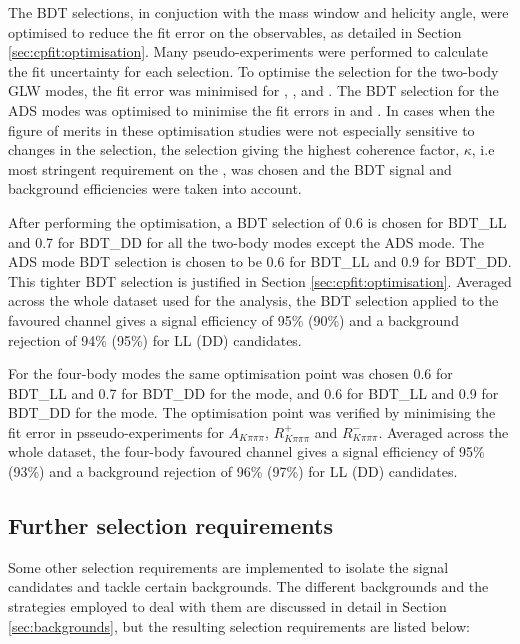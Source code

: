 The BDT selections, in conjuction with the \Kstarm mass window and \KS helicity angle, were optimised to reduce the fit error on the \CP observables, as detailed in Section \ref{sec:cpfit:optimisation}. Many pseudo-experiments were performed to calculate the fit uncertainty for each selection. To optimise the selection for the two-body GLW modes, the fit error was minimised for \Akk, \Rkk, \Apipi and \Rpipi. The BDT selection for the ADS modes was optimised to minimise the fit errors in \Rptwo and \Rmtwo. In cases when the figure of merits in these optimisation studies were not especially sensitive to changes in the selection, the selection giving the highest coherence factor, $\kappa$, i.e most stringent requirement on the \Kstarm, was chosen and the BDT signal and background efficiencies were taken into account.

After performing the optimisation, a BDT selection of 0.6 is chosen for BDT\_LL and 0.7 for BDT\_DD for all the two-body \D modes except the ADS mode. The ADS mode BDT selection is chosen to be 0.6 for BDT\_LL and 0.9 for BDT\_DD. This tighter BDT selection is justified in Section \ref{sec:cpfit:optimisation}. Averaged across the whole dataset used for the analysis, the BDT selection applied to the favoured \kpi channel gives a signal efficiency of 95\% (90\%) and a background rejection of 94\% (95\%) for LL (DD) candidates. 

For the four-body modes the same optimisation point was chosen 0.6 for BDT\_LL and 0.7 for BDT\_DD for the \decay{\Dz}{\Kp\pim\pip\pim} \decay{\Dz}{\pi\pi\pi\pi} mode, and 0.6 for BDT\_LL and 0.9 for BDT\_DD for the \decay{\Dz}{\Kp\pim\pip\pim} mode. The optimisation point was verified by minimising the fit error in psseudo-experiments for $A_{K\pi\pi\pi}$, $R^+_{K\pi\pi\pi}$ and $R^-_{K\pi\pi\pi}$. Averaged across the whole dataset, the four-body favoured \kpipipi channel gives a signal efficiency of 95\% (93\%) and a background rejection of 96\% (97\%) for LL (DD) candidates.


\subsection{Further selection requirements}

Some other selection requirements are implemented to isolate the signal candidates and tackle certain backgrounds. The different backgrounds and the strategies employed to deal with them are discussed in detail in Section \ref{sec:backgrounds}, but the resulting selection requirements are listed below:

